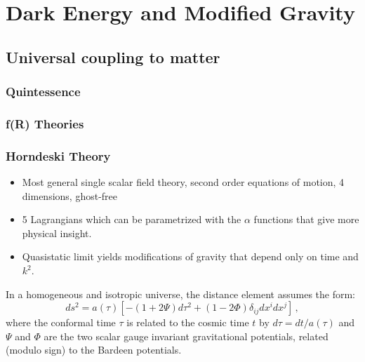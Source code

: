 \chapter{Dark Energy and Modified Gravity} %

\label{DE-MG} %





\section{Universal coupling to matter}

\subsection{Quintessence}

\subsection{f(R) Theories}

\subsection{Horndeski Theory}

\begin{itemize}
\item Most general single scalar field theory, second order equations of
motion, 4 dimensions, ghost-free
\item 5 Lagrangians which can be parametrized with the $\alpha$ functions
that give more physical insight.
\item Quasistatic limit yields modifications of gravity that depend only
on time and $k^{2}$.
\end{itemize}

In a homogeneous and isotropic universe, the distance element
assumes the form: 
\begin{equation}
ds^{2}=a(\tau)[-(1+2\Psi)d\tau^{2}+(1-2\Phi)\delta_{ij}dx^{i}dx^{j}]\,,
\end{equation}
where the conformal time $\tau$ is related to the cosmic time $t$
by $d\tau=d t/a(\tau)$ and $\Psi$ and $\Phi$ are the two scalar
gauge invariant gravitational potentials, related (modulo sign) to
the Bardeen potentials.

